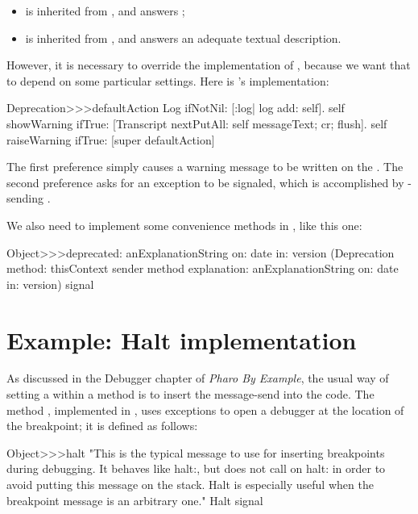 \begin{itemize}
\item {} is inherited from , and answers ;
\item {} is inherited from , and answers an adequate textual description.
\end{itemize}

However, it is necessary to override the implementation of , because we want that to depend on some particular settings.  Here is \pharo's implementation:
\begin{code}{}
Deprecation>>>defaultAction
	Log ifNotNil: [:log| log add: self].
	self showWarning  ifTrue:
		[Transcript nextPutAll: self messageText; cr; flush].
	self raiseWarning ifTrue:
		[super defaultAction]
\end{code}

The first preference simply causes a warning message to be written on the .  The second preference asks for an exception to be signaled, which is accomplished by \super-sending . 

We also need to implement some convenience methods in , like this one:
\begin{code}{}
Object>>>deprecated: anExplanationString on: date in: version
	(Deprecation
		method: thisContext sender method
		explanation: anExplanationString
		on: date
		in: version) signal
\end{code}

\section{Example: Halt implementation}

As discussed in the Debugger chapter of \emph{Pharo By Example}, 
the usual way of setting a  within a \st{} method is to insert the message-send  into the code. The method , implemented in , uses exceptions to open a debugger at the location of the breakpoint; it is defined as follows:

\begin{code}{}
Object>>>halt
	"This is the typical message to use for inserting breakpoints during 
	debugging. It behaves like halt:, but does not call on halt: in order to 
	avoid putting this message on the stack. Halt is especially useful when 
	the breakpoint message is an arbitrary one."
	Halt signal
\end{code}

